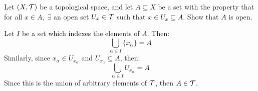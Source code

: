 \begin{ExerciseList}
    \Exercise[difficulty=1] Let $(X, \mathcal{T})$ be a topological space, %
    and let $A\subseteq X$ be a set with the property that for all %
    $x\in A,\;\exists$ an open set $U_x\in\mathcal{T}$ such that $x\in U_x %
    \subseteq A$. Show that $A$ is open.

    \Answer Let $I$ be a set which indexes the elements of $A$. Then:
    \[\bigcup_{\alpha\in I} \{x_{\alpha}\} = A\]
    Similarly, since $x_{\alpha} \in U_{x_{\alpha}}$ and %
    $U_{x_{\alpha}} \subseteq A$, then:
    \[\bigcup_{\alpha\in I} U_{x_{\alpha}} = A\]
    Since this is the union of arbitrary elements of $\mathcal{T}$, then %
    $A\in\mathcal{T}$.

\end{ExerciseList}
